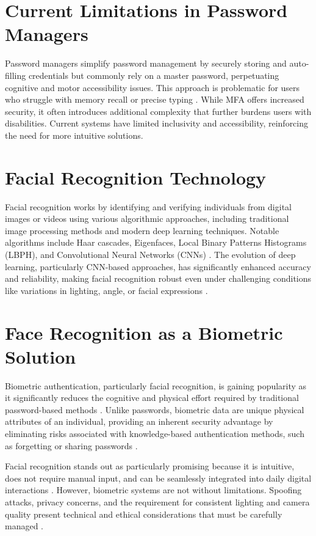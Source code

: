 \clearpage

\section{Current Limitations in Password Managers}
Password managers simplify password management by securely storing and auto-filling credentials but commonly rely on a master password, perpetuating cognitive and motor accessibility issues. This approach is problematic for users who struggle with memory recall or precise typing \autocite{IALabs2024}. While MFA offers increased security, it often introduces additional complexity that further burdens users with disabilities. Current systems have limited inclusivity and accessibility, reinforcing the need for more intuitive solutions.

\section{Facial Recognition Technology}
Facial recognition works by identifying and verifying individuals from digital images or videos using various algorithmic approaches, including traditional image processing methods and modern deep learning techniques. Notable algorithms include Haar cascades, Eigenfaces, Local Binary Patterns Histograms (LBPH), and Convolutional Neural Networks (CNNs) \autocite{ElSayed2015}. The evolution of deep learning, particularly CNN-based approaches, has significantly enhanced accuracy and reliability, making facial recognition robust even under challenging conditions like variations in lighting, angle, or facial expressions \autocite{ZhangDlib2020}.\\


\section{Face Recognition as a Biometric Solution}
Biometric authentication, particularly facial recognition, is gaining popularity as it significantly reduces the cognitive and physical effort required by traditional password-based methods \autocite{Furnell2022}. 
Unlike passwords, biometric data are unique physical attributes of an individual, providing an inherent security advantage by eliminating risks associated with knowledge-based authentication methods, 
such as forgetting or sharing passwords \autocite{Pant2022}.

Facial recognition stands out as particularly promising because it is intuitive, does not require manual input, and can be seamlessly integrated into daily digital interactions \autocite{Bhatt2011}. However, biometric systems are not without limitations. Spoofing attacks, privacy concerns, and the requirement for consistent lighting and camera quality present technical and ethical considerations that must be carefully managed \autocite{Kuznetsov2024, Bahia2024}.


